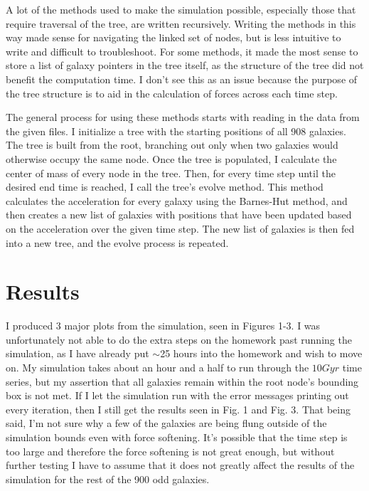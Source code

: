 \documentclass[twocolumn,11pt]{article}
\begin{document}
A lot of the methods used to make the simulation possible, especially those that require traversal of the tree, are written recursively. Writing the methods in this way made sense for navigating the linked set of nodes, but is less intuitive to write and difficult to troubleshoot. For some methods, it made the most sense to store a list of galaxy pointers in the tree itself, as the structure of the tree did not benefit the computation time. I don't see this as an issue because the purpose of the tree structure is to aid in the calculation of forces across each time step.

The general process for using these methods starts with reading in the data from the given files. I initialize a tree with the starting positions of all 908 galaxies. The tree is built from the root, branching out only when two galaxies would otherwise occupy the same node. Once the tree is populated, I calculate the center of mass of every node in the tree. Then, for every time step until the desired end time is reached, I call the tree's evolve method. This method calculates the acceleration for every galaxy using the Barnes-Hut method, and then creates a new list of galaxies with positions that have been updated based on the acceleration over the given time step. The new list of galaxies is then fed into a new tree, and the evolve process is repeated.

\section*{Results}
I produced 3 major plots from the simulation, seen in Figures 1-3. I was unfortunately not able to do the extra steps on the homework past running the simulation, as I have already put $\sim$25 hours into the homework and wish to move on. My simulation takes about an hour and a half to run through the $10Gyr$ time series, but my assertion that all galaxies remain within the root node's bounding box is not met. If I let the simulation run with the error messages printing out every iteration, then I still get the results seen in Fig. 1 and Fig. 3. That being said, I'm not sure why a few of the galaxies are being flung outside of the simulation bounds even with force softening. It's possible that the time step is too large and therefore the force softening is not great enough, but without further testing I have to assume that it does not greatly affect the results of the simulation for the rest of the 900 odd galaxies.
\end{document}
